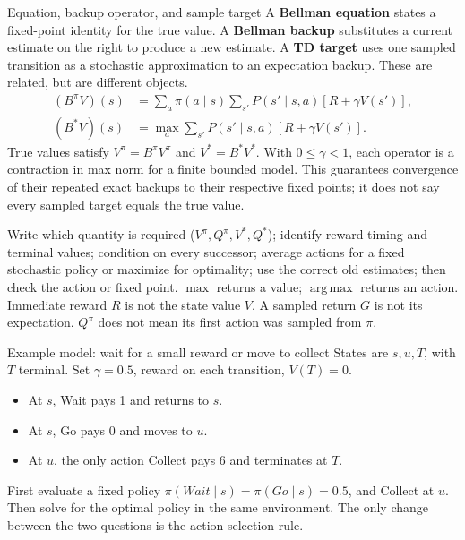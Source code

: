 \documentclass[10pt,a4paper]{article}
\newcommand{\argmax}{\operatorname*{arg\,max}}
\begin{document}
\begin{card}{Equation, backup operator, and sample target}
A \textbf{Bellman equation} states a fixed-point identity for the true value. A \textbf{Bellman backup} substitutes a current estimate on the right to produce a new estimate. A \textbf{TD target} uses one sampled transition as a stochastic approximation to an expectation backup. These are related, but are different objects.
\[
\begin{aligned}
(B^\pi V)(s)&=\sum_a\pi(a\mid s)\sum_{s'}P(s'\mid s,a)[R+\gamma V(s')],\\
(B^* V)(s)&=\max_a\sum_{s'}P(s'\mid s,a)[R+\gamma V(s')].
\end{aligned}
\]
True values satisfy $V^\pi=B^\pi V^\pi$ and $V^*=B^*V^*$. With $0\le\gamma<1$, each operator is a contraction in max norm for a finite bounded model. This guarantees convergence of their repeated exact backups to their respective fixed points; it does not say every sampled target equals the true value.
\end{card}

\begin{note}
Write which quantity is required ($V^\pi,Q^\pi,V^*,Q^*$); identify reward timing and terminal values; condition on every successor; average actions for a fixed stochastic policy or maximize for optimality; use the correct old estimates; then check the action or fixed point. $\max$ returns a value; $\argmax$ returns an action. Immediate reward $R$ is not the state value $V$. A sampled return $G$ is not its expectation. $Q^\pi$ does not mean its first action was sampled from $\pi$.
\end{note}

\begin{card}{Example model: wait for a small reward or move to collect}
States are $s,u,T$, with $T$ terminal. Set $\gamma=0.5$, reward on each transition, $V(T)=0$.
\begin{itemize}
\item At $s$, Wait pays 1 and returns to $s$.
\item At $s$, Go pays 0 and moves to $u$.
\item At $u$, the only action Collect pays 6 and terminates at $T$.
\end{itemize}
First evaluate a fixed policy $\pi(Wait\mid s)=\pi(Go\mid s)=0.5$, and Collect at $u$. Then solve for the optimal policy in the same environment. The only change between the two questions is the action-selection rule.
\end{card}
\end{document}

